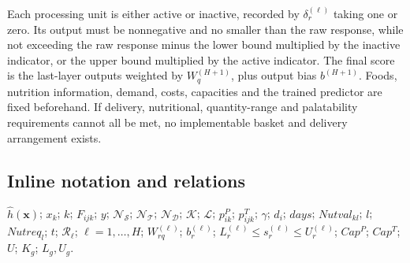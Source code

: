\documentclass[10pt]{article}
\begin{document}
Each processing unit is either active or inactive, recorded by $\delta_r^{(\ell)}$ taking one or zero. Its output must be nonnegative and no smaller than the raw response, while not exceeding the raw response minus the lower bound multiplied by the inactive indicator, or the upper bound multiplied by the active indicator. The final score is the last-layer outputs weighted by $W_q^{(H+1)}$, plus output bias $b^{(H+1)}$. Foods, nutrition information, demand, costs, capacities and the trained predictor are fixed beforehand. If delivery, nutritional, quantity-range and palatability requirements cannot all be met, no implementable basket and delivery arrangement exists.

\subsection*{Inline notation and relations}
$\hat h(\boldsymbol{x})$; $x_k$; $k$; $F_{ijk}$; $y$; $\mathcal N_{\mathcal S}$; $\mathcal N_{\mathcal T}$; $\mathcal N_{\mathcal D}$; $\mathcal K$; $\mathcal L$; $p_{ik}^P$; $p_{ijk}^T$; $\gamma$; $d_i$; $days$; $Nutval_{kl}$; $l$; $Nutreq_l$; $t$; $\mathcal R_\ell$; $\ell=1,\dots,H$; $W_{rq}^{(\ell)}$; $b_r^{(\ell)}$; $L_r^{(\ell)} \le s_r^{(\ell)} \le U_r^{(\ell)}$; $Cap^P$; $Cap^T$; $U$; $K_g$; $L_g,U_g$.
\end{document}
